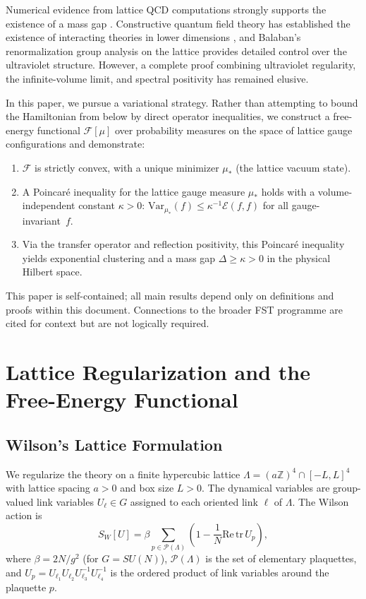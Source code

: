 \documentclass[12pt,a4paper]{article}
\theoremstyle{definition}
\theoremstyle{plain}
\theoremstyle{remark}
\begin{document}
Numerical evidence from lattice QCD computations strongly supports the existence of a mass gap \cite{Wilson1974, CreutzJacobsRebbi1983}. Constructive quantum field theory has established the existence of interacting theories in lower dimensions \cite{GlimmJaffe1987}, and Balaban's renormalization group analysis on the lattice \cite{Balaban1985a, Balaban1985b, Balaban1984c} provides detailed control over the ultraviolet structure. However, a complete proof combining ultraviolet regularity, the infinite-volume limit, and spectral positivity has remained elusive.

In this paper, we pursue a variational strategy. Rather than attempting to bound the Hamiltonian from below by direct operator inequalities, we construct a free-energy functional $\mathcal{F}[\mu]$ over probability measures on the space of lattice gauge configurations and demonstrate:
\begin{enumerate}
    \item $\mathcal{F}$ is strictly convex, with a unique minimizer $\mu_*$ (the lattice vacuum state).
    \item A Poincar\'e inequality for the lattice gauge measure $\mu_*$ holds with a volume-independent constant $\kappa > 0$: $\mathrm{Var}_{\mu_*}(f) \leq \kappa^{-1} \mathcal{E}(f,f)$ for all gauge-invariant~$f$.
    \item Via the transfer operator and reflection positivity, this Poincar\'e inequality yields exponential clustering and a mass gap $\Delta \geq \kappa > 0$ in the physical Hilbert space.
\end{enumerate}

This paper is self-contained; all main results depend only on definitions and proofs within this document. Connections to the broader FST programme are cited for context but are not logically required.

\section{Lattice Regularization and the Free-Energy Functional}

\subsection{Wilson's Lattice Formulation}

We regularize the theory on a finite hypercubic lattice $\Lambda = (a\mathbb{Z})^4 \cap [-L, L]^4$ with lattice spacing $a > 0$ and box size $L > 0$. The dynamical variables are group-valued link variables $U_\ell \in G$ assigned to each oriented link $\ell$ of $\Lambda$. The Wilson action is
\begin{equation}\label{eq:Wilson-action}
    S_W[U] = \beta \sum_{p \in \mathcal{P}(\Lambda)} \left(1 - \frac{1}{N} \mathrm{Re}\, \mathrm{tr}\, U_p \right),
\end{equation}
where $\beta = 2N/g^2$ (for $G = SU(N)$), $\mathcal{P}(\Lambda)$ is the set of elementary plaquettes, and $U_p = U_{\ell_1} U_{\ell_2} U_{\ell_3}^{-1} U_{\ell_4}^{-1}$ is the ordered product of link variables around the plaquette $p$.
\end{document}
